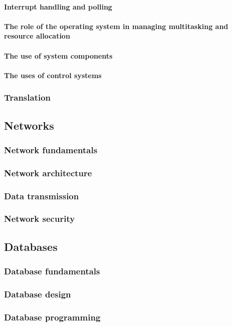 \paragraph{Interrupt handling and polling}
\paragraph{The role of the operating system in managing multitasking and resource allocation}
\paragraph{The use of system components}
\paragraph{The uses of control systems}
\subsubsection{Translation}
\subsection{Networks}
\subsubsection{Network fundamentals}
\subsubsection{Network architecture}
\subsubsection{Data transmission}
\subsubsection{Network security}
\subsection{Databases}
\subsubsection{Database fundamentals}
\subsubsection{Database design}
\subsubsection{Database programming}
